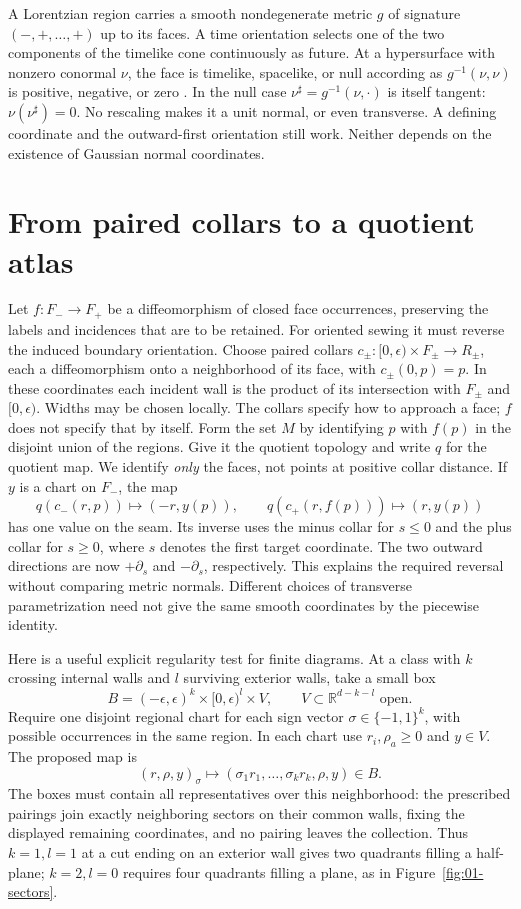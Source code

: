 A Lorentzian region carries a smooth nondegenerate metric $g$ of signature $(-,+,\ldots,+)$ up to its faces. A time orientation selects one of the two components of the timelike cone continuously as future. At a hypersurface with nonzero conormal $\nu$, the face is timelike, spacelike, or null according as $g^{-1}(\nu,\nu)$ is positive, negative, or zero \cite{ON}. In the null case $\nu^\sharp=g^{-1}(\nu,\cdot)$ is itself tangent: $\nu(\nu^\sharp)=0$. No rescaling makes it a unit normal, or even transverse. A defining coordinate and the outward-first orientation still work. Neither depends on the existence of Gaussian normal coordinates.

\section{From paired collars to a quotient atlas}

Let $f:F_-\to F_+$ be a diffeomorphism of closed face occurrences, preserving the labels and incidences that are to be retained. For oriented sewing it must reverse the induced boundary orientation. Choose paired collars $c_\pm:[0,\epsilon)\times F_\pm\to R_\pm$, each a diffeomorphism onto a neighborhood of its face, with $c_\pm(0,p)=p$. In these coordinates each incident wall is the product of its intersection with $F_\pm$ and $[0,\epsilon)$. Widths may be chosen locally. The collars specify how to approach a face; $f$ does not specify that by itself. Form the set $M$ by identifying $p$ with $f(p)$ in the disjoint union of the regions. Give it the quotient topology and write $q$ for the quotient map. We identify \emph{only} the faces, not points at positive collar distance. If $y$ is a chart on $F_-$, the map
\[
 q(c_-(r,p))\longmapsto(-r,y(p)),\qquad
 q(c_+(r,f(p)))\longmapsto(r,y(p))
\]
has one value on the seam. Its inverse uses the minus collar for $s\leq 0$ and the plus collar for $s\geq 0$, where $s$ denotes the first target coordinate. The two outward directions are now $+\partial_s$ and $-\partial_s$, respectively. This explains the required reversal without comparing metric normals. Different choices of transverse parametrization need not give the same smooth coordinates by the piecewise identity.

Here is a useful explicit regularity test for finite diagrams. At a class with $k$ crossing internal walls and $l$ surviving exterior walls, take a small box
\[
 B=(-\epsilon,\epsilon)^k\times[0,\epsilon)^l\times V,
 \qquad V\subset\mathbb R^{d-k-l}\text{ open}.
\]
Require one disjoint regional chart for each sign vector $\sigma\in\{-1,1\}^k$, with possible occurrences in the same region. In each chart use $r_i,\rho_a\geq0$ and $y\in V$. The proposed map is
\[
 (r,\rho,y)_\sigma\longmapsto
 (\sigma_1r_1,\ldots,\sigma_kr_k,\rho,y)\in B.
\]
The boxes must contain all representatives over this neighborhood: the prescribed pairings join exactly neighboring sectors on their common walls, fixing the displayed remaining coordinates, and no pairing leaves the collection. Thus $k=1,l=1$ at a cut ending on an exterior wall gives two quadrants filling a half-plane; $k=2,l=0$ requires four quadrants filling a plane, as in Figure~\ref{fig:01-sectors}.

